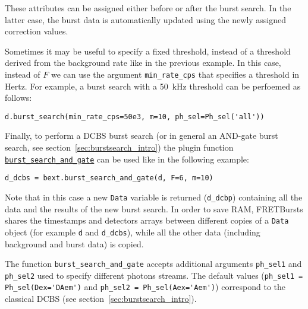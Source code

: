 These attributes can be assigned either before or after the burst search. In the latter case, the burst data is
automatically updated using the newly assigned correction values.

Sometimes it may be useful to specify a fixed threshold, instead 
of a threshold derived from the background rate like in the previous example. In this case, instead of $F$ we can use the argument \verb|min_rate_cps| that specifies a threshold in Hertz. For example, a burst search with a 50~kHz
threshold can be perfoemed as follows:

\begin{verbatim}
d.burst_search(min_rate_cps=50e3, m=10, ph_sel=Ph_sel('all'))
\end{verbatim}

Finally, to perform a DCBS burst search (or in general an AND-gate burst search, 
see section~\ref{sec:burstsearch_intro}) the plugin function 
\href{http://fretbursts.readthedocs.org/en/latest/plugins.html#fretbursts.burstlib_ext.burst_search_and_gate}{\verb|burst_search_and_gate|} 
can be used like in the following example:

\begin{verbatim}
d_dcbs = bext.burst_search_and_gate(d, F=6, m=10)
\end{verbatim}

Note that in this case a new \verb|Data| variable is returned (\verb|d_dcbp|) containing all the data and the results of the new burst search. In order to save RAM, FRETBursts shares the timestamps and detectors arrays between different copies of a \verb|Data| object (for example \verb|d| and \verb|d_dcbs|), while all the other data (including background and burst data) is copied. 

The function \verb|burst_search_and_gate| accepts additional arguments \verb|ph_sel1| and \verb|ph_sel2| 
used to specify different photons streams. The default values 
(\verb|ph_sel1 = Ph_sel(Dex='DAem')| and \verb|ph_sel2 = Ph_sel(Aex='Aem')|) correspond to the classical DCBS 
(see section~\ref{sec:burstsearch_intro}).

